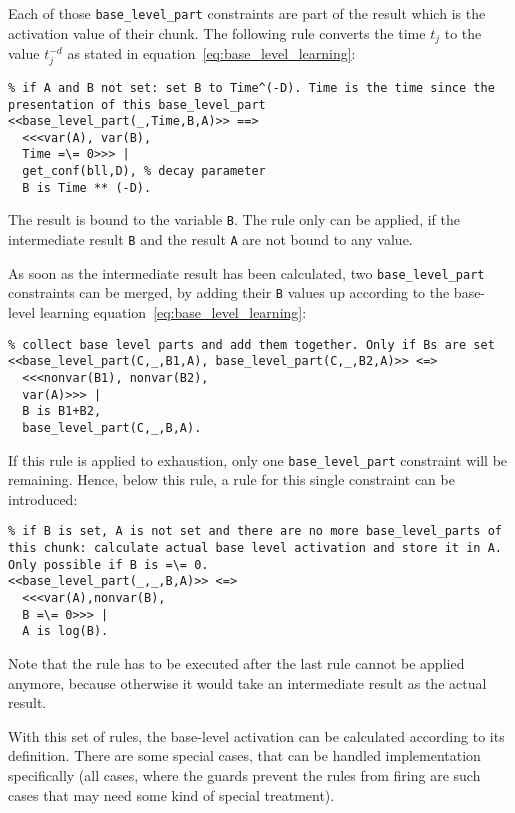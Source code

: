 Each of those \lstinline|base_level_part| constraints are part of the result which is the activation value of their chunk. The following rule converts the time $t_j$ to the value $t_j^{-d}$ as stated in equation~\eqref{eq:base_level_learning}:

\begin{lstlisting}
% if A and B not set: set B to Time^(-D). Time is the time since the presentation of this base_level_part
<<base_level_part(_,Time,B,A)>> ==>
  <<<var(A), var(B), 
  Time =\= 0>>> |
  get_conf(bll,D), % decay parameter
  B is Time ** (-D).
\end{lstlisting}

The result is bound to the variable \lstinline|B|. The rule only can be applied, if the intermediate result \lstinline|B| and the result \lstinline|A| are not bound to any value.

As soon as the intermediate result has been calculated, two \lstinline|base_level_part| constraints can be merged, by adding their \lstinline|B| values up according to the base-level learning equation~\eqref{eq:base_level_learning}:

\begin{lstlisting}
% collect base level parts and add them together. Only if Bs are set
<<base_level_part(C,_,B1,A), base_level_part(C,_,B2,A)>> <=>
  <<<nonvar(B1), nonvar(B2), 
  var(A)>>> |
  B is B1+B2,
  base_level_part(C,_,B,A).
\end{lstlisting}

If this rule is applied to exhaustion, only one \lstinline|base_level_part| constraint will be remaining. Hence, below this rule, a rule for this single constraint can be introduced:

\begin{lstlisting}
% if B is set, A is not set and there are no more base_level_parts of this chunk: calculate actual base level activation and store it in A. Only possible if B is =\= 0.
<<base_level_part(_,_,B,A)>> <=>
  <<<var(A),nonvar(B), 
  B =\= 0>>> |
  A is log(B).
\end{lstlisting}

Note that the rule has to be executed after the last rule cannot be applied anymore, because otherwise it would take an intermediate result as the actual result.

With this set of rules, the base-level activation can be calculated according to its definition. There are some special cases, that can be handled implementation specifically (all cases, where the guards prevent the rules from firing are such cases that may need some kind of special treatment).

